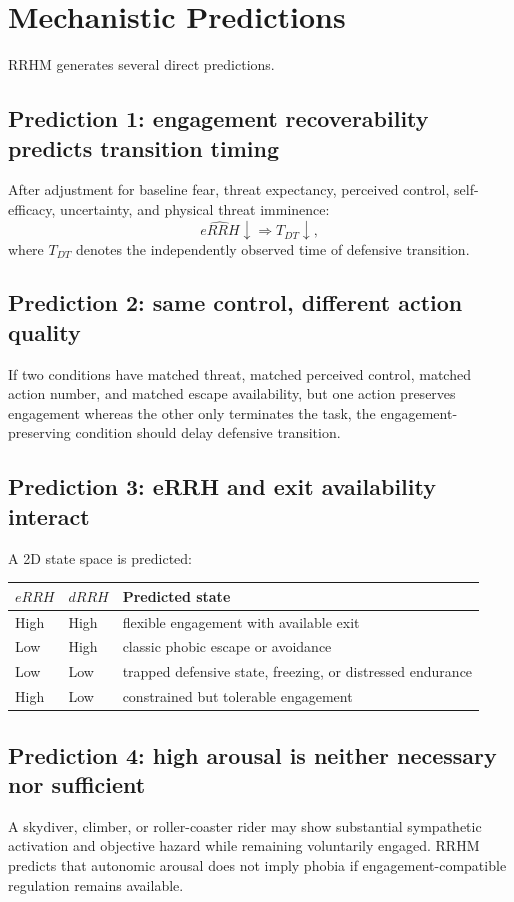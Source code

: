 \documentclass[9pt,twocolumn]{article}
\begin{document}
\section{Mechanistic Predictions}
RRHM generates several direct predictions.

\subsection{Prediction 1: engagement recoverability predicts transition timing}
After adjustment for baseline fear, threat expectancy, perceived control, self-efficacy, uncertainty, and physical threat imminence:
\[
\widehat{eRRH}\downarrow\Rightarrow T_{DT}\downarrow,
\]
where $T_{DT}$ denotes the independently observed time of defensive transition.

\subsection{Prediction 2: same control, different action quality}
If two conditions have matched threat, matched perceived control, matched action number, and matched escape availability, but one action preserves engagement whereas the other only terminates the task, the engagement-preserving condition should delay defensive transition.

\subsection{Prediction 3: eRRH and exit availability interact}
A 2D state space is predicted:
\begin{center}
\begin{tabular}{lll}
\toprule
$eRRH$ & $dRRH$ & Predicted state \\
\midrule
High & High & flexible engagement with available exit \\
Low & High & classic phobic escape or avoidance \\
Low & Low & trapped defensive state, freezing, or distressed endurance \\
High & Low & constrained but tolerable engagement \\
\bottomrule
\end{tabular}
\end{center}

\subsection{Prediction 4: high arousal is neither necessary nor sufficient}
A skydiver, climber, or roller-coaster rider may show substantial sympathetic activation and objective hazard while remaining voluntarily engaged. RRHM predicts that autonomic arousal does not imply phobia if engagement-compatible regulation remains available.
\end{document}
